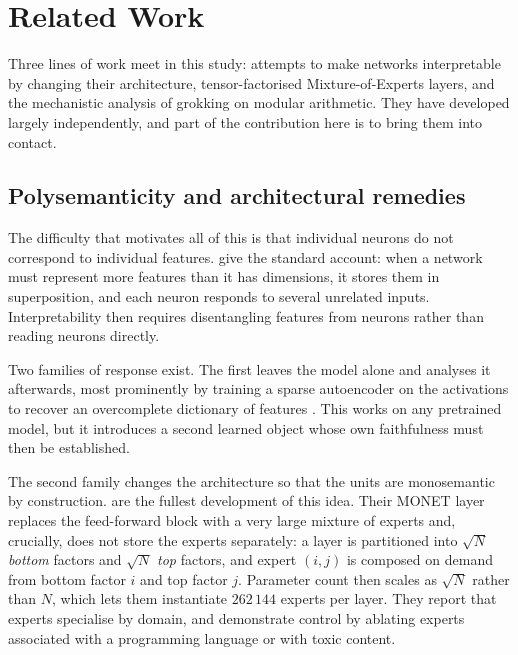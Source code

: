 \section{Related Work}
\label{sec:related}

Three lines of work meet in this study: attempts to make networks interpretable
by changing their architecture, tensor-factorised Mixture-of-Experts layers,
and the mechanistic analysis of grokking on modular arithmetic. They have
developed largely independently, and part of the contribution here is to bring
them into contact.

\subsection{Polysemanticity and architectural remedies}

The difficulty that motivates all of this is that individual neurons do not
correspond to individual features. \citet{elhage2022superposition} give the
standard account: when a network must represent more features than it has
dimensions, it stores them in superposition, and each neuron responds to
several unrelated inputs. Interpretability then requires disentangling
features from neurons rather than reading neurons directly.

Two families of response exist. The first leaves the model alone and analyses
it afterwards, most prominently by training a sparse autoencoder on the
activations to recover an overcomplete dictionary of features
\citep{bricken2023monosemanticity}. This works on any pretrained model, but it
introduces a second learned object whose own faithfulness must then be
established.

The second family changes the architecture so that the units are monosemantic
by construction. \citet{park2025monet} are the fullest development of this
idea. Their MONET layer replaces the feed-forward block with a very large
mixture of experts and, crucially, does not store the experts separately: a
layer is partitioned into $\sqrt{N}$ \emph{bottom} factors and $\sqrt{N}$
\emph{top} factors, and expert $(i,j)$ is composed on demand from bottom
factor $i$ and top factor $j$. Parameter count then scales as $\sqrt{N}$
rather than $N$, which lets them instantiate $262\,144$ experts per layer.
They report that experts specialise by domain, and demonstrate control by
ablating experts associated with a programming language or with toxic content.

